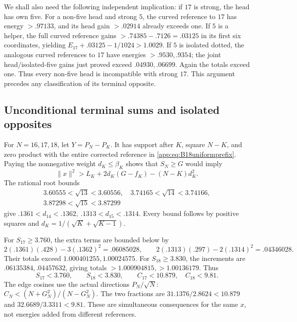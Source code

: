 \documentclass[11pt]{article}
\theoremstyle{definition}
\theoremstyle{remark}
\newcommand{\norm}[1]{\lVert #1\rVert}
\begin{document}
We shall also need the following independent implication:
if \(17\) is strong, the head has own five.
For a non-five head and strong \(5\), the curved reference to
\(17\) has energy \(>.97133\), and its head gain \(>.02914\)
already exceeds one. If \(5\) is a helper, the full curved
reference gains \(>.74385-.7126=.03125\) in its first six
coordinates, yielding
\(E_{17}+.03125-1/1024>1.0029\).
If \(5\) is isolated dotted, the analogous curved references
to \(17\) have energies \(>.9530,.9354\); the joint
head/isolated-five gains just proved exceed \(.04930,.06699\).
Again the totals exceed one. Thus every non-five head is
incompatible with strong \(17\). This argument precedes any
classification of its terminal opposite.

\subsection{Unconditional terminal sums and isolated opposites}
\label{app:B18sumcutoffs}
For \(N=16,17,18\), let \(Y=P_N-P_K\).
It has support after \(K\), square \(N-K\), and zero product
with the entire corrected reference in
\eqref{app:eq:B18uniformprefix}.
Paying the nonnegative weight \(d_K\leq\beta_K\) shows that
\(S_N\geq G\) would imply
\[
 \norm x^2>L_K+2d_K(G-f_K)-(N-K)d_K^2.
\]
The rational root bounds
\[
\begin{gathered}
3.60555<\sqrt{13}<3.60556,\quad
3.74165<\sqrt{14}<3.74166,\\
3.87298<\sqrt{15}<3.87299
\end{gathered}
\]
give
\(.1361<d_{14}<.1362,\ .1313<d_{15}<.1314\).
Every bound follows by positive squares and
\(d_K=1/(\sqrt K+\sqrt{K-1})\).

For \(S_{17}\geq3.760\), the extra terms are bounded below by
\[
 2(.1361)(.428)-3(.1362)^2=.06085028,\qquad
 2(.1313)(.297)-2(.1314)^2=.04346028.
\]
Their totals exceed \(1.000401255,\allowbreak 1.00024575\).
For \(S_{18}\geq3.830\), the increments are
\(.06135384,\allowbreak .04457632\), giving totals
\(>1.000904815,\allowbreak >1.00136179\).
Thus
\begin{equation}\label{app:eq:B18sumbounds}
 S_{17}<3.760,\qquad S_{18}<3.830,\qquad
 C_{17}<10.879,\quad C_{18}<9.81 .
\end{equation}
The edge cosines use the actual directions
\(P_N/\sqrt N\):
\(C_N<(N+G_N^2)/(N-G_N^2)\).
The two fractions are
\(31.1376/2.8624<10.879\) and
\(32.6689/3.3311<9.81\).
These are simultaneous consequences for the same \(x\),
not energies added from different references.
\end{document}
